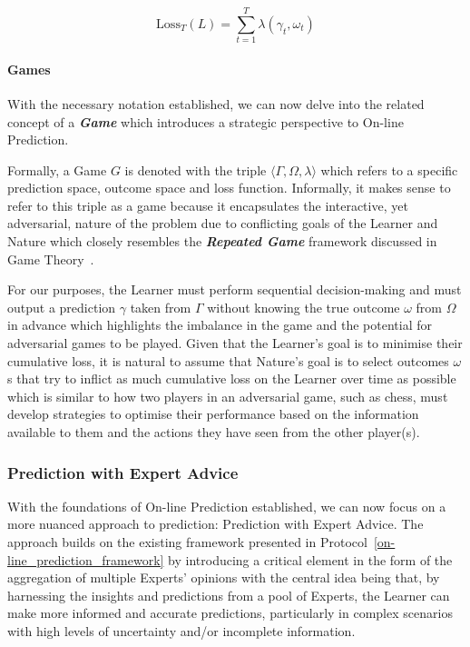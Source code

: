 \begin{equation}
    \text{Loss}_T(L) = \underset{t=1}{\overset{T}{\sum}} \lambda(\gamma_t, \omega_t)
\end{equation}

\paragraph{Games}\label{paragraph:games}
With the necessary notation established, we can now delve into the related concept of a \textbf{\textit{Game}} which introduces a strategic perspective to On-line Prediction.

Formally, a Game $G$ is denoted with the triple $\langle \Gamma, \Omega, \lambda \rangle$ which refers to a specific prediction space, outcome space and loss function. Informally, it makes sense to refer to this triple as a game because it encapsulates the interactive, yet adversarial, nature of the problem due to conflicting goals of the Learner and Nature which closely resembles the \textbf{\textit{Repeated Game}} framework discussed in Game Theory~\cite{mertens:1990}.

For our purposes, the Learner must perform sequential decision-making and must output a prediction $\gamma$ taken from $\Gamma$ without knowing the true outcome $\omega$ from $\Omega$ in advance which highlights the imbalance in the game and the potential for adversarial games to be played. Given that the Learner's goal is to minimise their cumulative loss, it is natural to assume that Nature's goal is to select outcomes $\omega$s that try to inflict as much cumulative loss on the Learner over time as possible which is similar to how two players in an adversarial game, such as chess, must develop strategies to optimise their performance based on the information available to them and the actions they have seen from the other player(s).

\subsubsection{Prediction with Expert Advice}\label{subsubsection:prediction_with_expert_advice}
With the foundations of On-line Prediction established, we can now focus on a more nuanced approach to prediction: Prediction with Expert Advice. The approach builds on the existing framework presented in Protocol~\ref{on-line_prediction_framework} by introducing a critical element in the form of the aggregation of multiple Experts' opinions with the central idea being that, by harnessing the insights and predictions from a pool of Experts, the Learner can make more informed and accurate predictions, particularly in complex scenarios with high levels of uncertainty and/or incomplete information.

